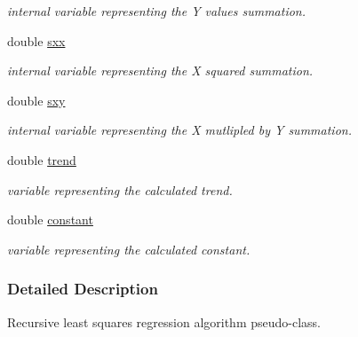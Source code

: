 \begin{DoxyCompactItemize}
\begin{DoxyCompactList}\small\item\em internal variable representing the Y values summation. \end{DoxyCompactList}\item 
\hypertarget{struct_r_l_s_r_ade5139504701944a91ebee91d7df8de2}{double \hyperlink{struct_r_l_s_r_ade5139504701944a91ebee91d7df8de2}{sxx}}\label{struct_r_l_s_r_ade5139504701944a91ebee91d7df8de2}

\begin{DoxyCompactList}\small\item\em internal variable representing the X squared summation. \end{DoxyCompactList}\item 
\hypertarget{struct_r_l_s_r_a466bed83db1df94f12bd0dba5385d518}{double \hyperlink{struct_r_l_s_r_a466bed83db1df94f12bd0dba5385d518}{sxy}}\label{struct_r_l_s_r_a466bed83db1df94f12bd0dba5385d518}

\begin{DoxyCompactList}\small\item\em internal variable representing the X mutlipled by Y summation. \end{DoxyCompactList}\item 
\hypertarget{struct_r_l_s_r_a16a2f579191db59d0a637f17b67172ce}{double \hyperlink{struct_r_l_s_r_a16a2f579191db59d0a637f17b67172ce}{trend}}\label{struct_r_l_s_r_a16a2f579191db59d0a637f17b67172ce}

\begin{DoxyCompactList}\small\item\em variable representing the calculated trend. \end{DoxyCompactList}\item 
\hypertarget{struct_r_l_s_r_a3d261056ca3667cbc21f0cd453d2d13e}{double \hyperlink{struct_r_l_s_r_a3d261056ca3667cbc21f0cd453d2d13e}{constant}}\label{struct_r_l_s_r_a3d261056ca3667cbc21f0cd453d2d13e}

\begin{DoxyCompactList}\small\item\em variable representing the calculated constant. \end{DoxyCompactList}\end{DoxyCompactItemize}


\subsubsection{Detailed Description}
Recursive least squares regression algorithm pseudo-\/class.

